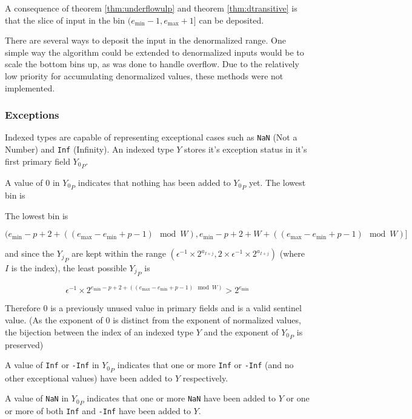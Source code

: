 \documentclass[12pt]{article}
\providecommand{\min}{\ensuremath{\text{min}}}
\providecommand{\max}{\ensuremath{\text{max}}}
\theoremstyle{plain}
\begin{document}
      A consequence of theorem \ref{thm:underflowulp} and theorem \ref{thm:dtransitive} is that the slice of input in the bin $(e_{\min} - 1, e_{\max} + 1]$ can be deposited.

      There are several ways to deposit the input in the denormalized range. One simple way the algorithm could be extended to denormalized inputs would be to scale the bottom bins up, as was done to handle overflow. Due to the relatively low priority for accumulating denormalized values, these methods were not implemented.

    \subsubsection{Exceptions}
      Indexed types are capable of representing exceptional cases such as \verb|NaN| (Not a Number) and \verb|Inf| (Infinity). An indexed type $Y$ stores it's exception status in it's first primary field ${Y_0}_P$.

      A value of $0$ in ${Y_0}_P$ indicates that nothing has been added to ${Y_0}_P$ yet. The lowest bin is

      The lowest bin is

      \begin{equation*}
      (e_{\min} - p + 2 + ((e_{\max} - e_{\min} + p - 1 ) \mod W), e_{\min} - p + 2 + W + ((e_{\max} - e_{\min} + p - 1)\mod W)]
      \end{equation*}

      and since the ${Y_j}_P$ are kept within the range $(\epsilon^{-1} \times 2^{a_{I + j}}, 2 \times \epsilon^{-1} \times 2^{a_{I + j}})$ (where $I$ is the index), the least possible ${Y_j}_P$ is

      \begin{equation*}
      \epsilon^{-1} \times 2^{e_{\min} - p + 2 + ((e_{\max} - e_{\min} + p - 1)\mod W)} > 2^{e_{\min}}
      \end{equation*}

      Therefore $0$ is a previously unused value in primary fields and is a valid sentinel value. (As the exponent of $0$ is distinct from the exponent of normalized values, the bijection between the index of an indexed type $Y$ and the exponent of ${Y_0}_P$ is preserved)

      A value of \verb|Inf| or \verb|-Inf| in ${Y_0}_P$ indicates that one or more \verb|Inf| or \verb|-Inf| (and no other exceptional values) have been added to $Y$ respectively.

      A value of \verb|NaN| in ${Y_0}_P$ indicates that one or more \verb|NaN| have been added to $Y$ or one or more of both \verb|Inf| and \verb|-Inf| have been added to $Y$.
\end{document}
